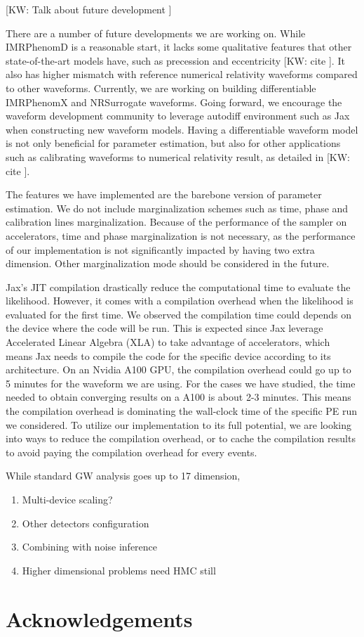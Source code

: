 \documentclass[twocolumn]{aastex631}
\newcommand{\kw}[1]{{\color{rb4}[KW: #1 ]}}
\begin{document}
\kw{Talk about future development}


There are a number of future developments we are working on.
While IMRPhenomD is a reasonable start, it lacks some qualitative features that other state-of-the-art models have,
such as precession and eccentricity \kw{cite}.
It also has higher mismatch with reference numerical relativity waveforms compared to other waveforms.
Currently, we are working on building differentiable IMRPhenomX and NRSurrogate waveforms.
Going forward, we encourage the waveform development community to leverage autodiff environment such as Jax when constructing new waveform models.
Having a differentiable waveform model is not only beneficial for parameter estimation, but also for other applications such as calibrating waveforms to numerical relativity result, as detailed in \kw{cite}.

The features we have implemented are the barebone version of parameter estimation.
We do not include marginalization schemes such as time, phase and calibration lines marginalization.
Because of the performance of the sampler on accelerators, time and phase marginalization is not necessary,
as the performance of our implementation is not significantly impacted by having two extra dimension.
Other marginalization mode should be considered in the future.

Jax's JIT compilation drastically reduce the computational time to evaluate the likelihood.
However, it comes with a compilation overhead when the likelihood is evaluated for the first time.
We observed the compilation time could depends on the device where the code will be run.
This is expected since Jax leverage Accelerated Linear Algebra (XLA) to take advantage of accelerators,
which means Jax needs to compile the code for the specific device according to its architecture.
On an Nvidia A100 GPU, the compilation overhead could go up to 5 minutes for the waveform we are using.
For the cases we have studied, the time needed to obtain converging results on a A100 is about 2-3 minutes.
This means the compilation overhead is dominating the wall-clock time of the specific PE run we considered.
To utilize our implementation to its full potential, we are looking into ways to reduce the compilation overhead,
or to cache the compilation results to avoid paying the compilation overhead for every events.

While standard GW analysis goes up to 17 dimension, 
\begin{enumerate}
    \item Multi-device scaling?
    \item Other detectors configuration
    \item  Combining with noise inference
    \item Higher dimensional problems need HMC still
\end{enumerate}



\section{Acknowledgements}


\end{document}
